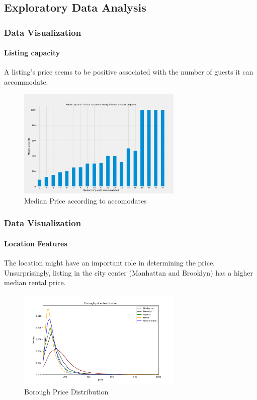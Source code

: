 \documentclass{beamer}
\begin{document}
\subsection{Exploratory Data Analysis}

\begin{frame}
  \frametitle{Data Visualization}
  \framesubtitle{Listing capacity}
 A listing's price seems to be positive associated with the number of guests
  it can accommodate.
\begin{figure}[H]
    \centering
        \centering
        \includegraphics[width=0.7\textwidth]{figures/Figure_8.png}
        \caption{Median Price according to  accomodates}
        \label{fig:median-price-by-accommodates}
      \end{figure}
\end{frame}

\begin{frame}
  \frametitle{Data Visualization}
  \framesubtitle{Location Features}
The location might have an important role in determining the price. Unsurprisingly,
listing in the city center (Manhattan and Brooklyn) has a higher median rental price.
\begin{figure}[H]\centering
  \includegraphics[width=0.7\textwidth]{figures/Figure_11_b.png}
    \caption{Borough Price Distribution}
    \label{fig:borough-price-distribution}
\end{figure}
\end{frame}
\end{document}
